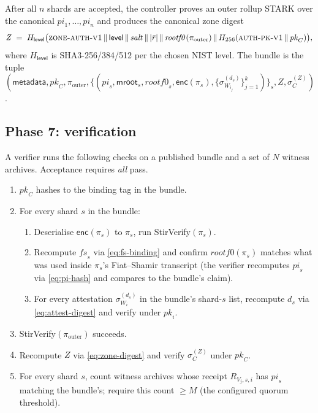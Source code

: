\documentclass[11pt,a4paper]{article}
\theoremstyle{definition}
\theoremstyle{plain}
\newcommand{\msg}[1]{\textsf{#1}}
\newcommand{\hash}{\ensuremath{H}}
\newcommand{\sig}[2]{\ensuremath{\sigma_{#1}^{(#2)}}}
\newcommand{\concat}{\,\Vert\,}
\begin{document}
After all $n$ shards are accepted, the controller proves an outer
rollup STARK over the canonical $\mathit{pi}_1, \dots, \mathit{pi}_n$
and produces the canonical zone digest
\begin{equation}
  \mathit{Z} \;=\; \hash_{\textsf{level}}\bigl(\textsc{zone-auth-v1}
       \concat \textsf{level}
       \concat \mathit{salt}
       \concat |\bar{r}|
       \concat \mathit{rootf0}(\pi_{\text{outer}})
       \concat \hash_{256}(\textsc{auth-pk-v1} \concat \mathit{pk}_C)\bigr),
  \label{eq:zone-digest}
\end{equation}
where $\hash_{\textsf{level}}$ is SHA3-256/384/512 per the chosen NIST
level.  The bundle is the tuple
$(\textsf{metadata}, \mathit{pk}_C, \pi_{\text{outer}},
\{(\mathit{pi}_s, \mathsf{mroot}_s, \mathit{rootf0}_s,
   \mathsf{enc}(\pi_s),
   \{\sig{W_{i_j}}{d_s}\}_{j=1}^k)\}_s,
\mathit{Z}, \sig{C}{Z})$.

\subsection{Phase 7: verification}
\label{sec:verify}

A verifier runs the following checks on a published bundle and a set
of $N$ witness archives.  Acceptance requires \emph{all} pass.
\begin{enumerate}[leftmargin=*]
  \item $\mathit{pk}_C$ hashes to the binding tag in the bundle.
  \item For every shard $s$ in the bundle:
    \begin{enumerate}[label=\alph*., leftmargin=*]
      \item Deserialise $\mathsf{enc}(\pi_s)$ to $\pi_s$, run
            \msg{StirVerify}$(\pi_s)$.
      \item Recompute $\mathit{fs}_s$ via \cref{eq:fs-binding} and
            confirm $\mathit{rootf0}(\pi_s)$ matches what was used
            inside $\pi_s$'s Fiat--Shamir transcript (the verifier
            recomputes $\mathit{pi}_s$ via \cref{eq:pi-hash} and
            compares to the bundle's claim).
      \item For every attestation $\sig{W_i}{d_s}$ in the bundle's
            shard-$s$ list, recompute $d_s$ via
            \cref{eq:attest-digest} and verify under
            $\mathit{pk}_i$.
    \end{enumerate}
  \item \msg{StirVerify}$(\pi_{\text{outer}})$ succeeds.
  \item Recompute $Z$ via \cref{eq:zone-digest} and verify
        $\sig{C}{Z}$ under $\mathit{pk}_C$.
  \item For every shard $s$, count witness archives whose receipt
        $R_{V_j, s, i}$ has $\mathit{pi}_s$ matching the bundle's;
        require this count $\ge M$ (the configured quorum
        threshold).
\end{enumerate}
\end{document}
